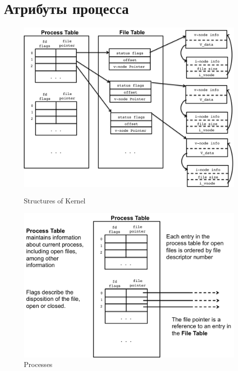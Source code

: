 \documentclass[../../lectures.tex]{subfiles}
\begin{document}
\section{Атрибуты процесса}
\begin{figure}[H]
\begin{minipage}[c]{0.5\linewidth}
\centering
\includegraphics[width=\textwidth]{images/kernel-datastructures.png}
\caption{Structures of Kernel}
\end{minipage}
\hspace{0.5cm}
\begin{minipage}[c]{0.5\linewidth}
\includegraphics[width=\textwidth]{images/process-table.png}
\caption{Processes}
\end{minipage}
\end{figure}
\end{document}
